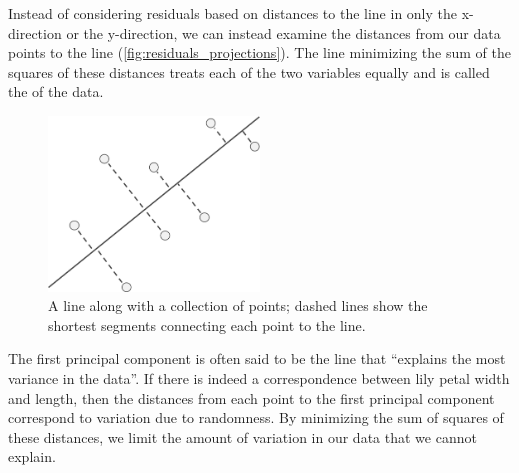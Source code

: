 Instead of considering residuals based on distances to the line in only the x-direction or the y-direction, we can instead examine the distances from our data points to the line (\autoref{fig:residuals_projections}). The line minimizing the sum of the squares of these distances treats each of the two variables equally and is called the  of the data.\\

\begin{figure}[h]
\centering
\mySfFamily
\includegraphics[width = 0.5\textwidth]{../images/residuals_projections.png}
\caption{A line along with a collection of points; dashed lines show the shortest segments connecting each point to the line.}
\label{fig:residuals_projections}
\end{figure}

The first principal component is often said to be the line that ``explains the most variance in the data''. If there is indeed a correspondence between lily petal width and length, then the distances from each point to the first principal component correspond to variation due to randomness. By minimizing the sum of squares of these distances, we limit the amount of variation in our data that we cannot explain.

%

